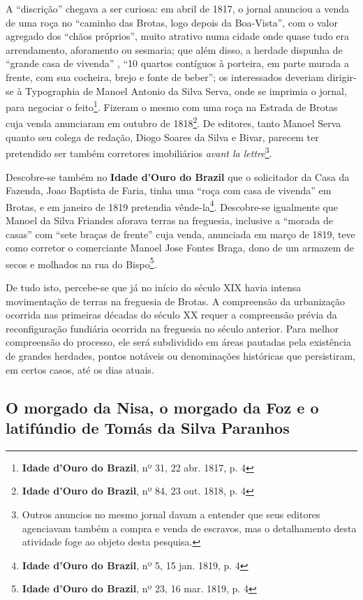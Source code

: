 A ``discrição'' chegava a ser curiosa: em abril de 1817, o jornal anunciou a venda de uma roça no ``caminho das Brotas, logo depois da Boa-Vista'', com o valor agregado dos ``chãos próprios'', muito atrativo numa cidade onde quase tudo era arrendamento, aforamento ou sesmaria; que além disso, a herdade dispunha de ``grande casa de vivenda'' , ``10 quartos contíguos à porteira, em parte murada a frente, com sua cocheira, brejo e fonte de beber''; os interessados deveriam dirigir-se à Typographia de Manoel Antonio da Silva Serva, onde se imprimia o jornal, para negociar o feito\footnote{\textbf{Idade d'Ouro do Brazil}, nº 31, 22 abr. 1817, p. 4}. Fizeram o mesmo com uma roça na Estrada de Brotas cuja venda anunciaram em outubro de 1818\footnote{\textbf{Idade d'Ouro do Brazil}, nº 84, 23 out. 1818, p. 4}. De editores, tanto Manoel Serva quanto seu colega de redação, Diogo Soares da Silva e Bivar, parecem ter pretendido ser também corretores imobiliários \textit{avant la lettre}\footnote{Outros anuncios no mesmo jornal davam a entender que seus editores agenciavam também a compra e venda de escravos, mas o detalhamento desta atividade foge ao objeto desta pesquisa.}.

Descobre-se também no \textbf{Idade d'Ouro do Brazil} que o solicitador da Casa da Fazenda, Joao Baptista de Faria, tinha uma ``roça com casa de vivenda'' em Brotas, e em janeiro de 1819 pretendia vênde-la\footnote{\textbf{Idade d'Ouro do Brazil}, nº 5, 15 jan. 1819, p. 4}. Descobre-se igualmente que Manoel da Silva Friandes aforava terras na freguesia, inclusive a ``morada de casas'' com ``sete braças de frente'' cuja venda, anunciada em março de 1819, teve como corretor o comerciante Manoel Jose Fontes Braga, dono de um armazem de secos e molhados na rua do Bispo\footnote{\textbf{Idade d'Ouro do Brazil}, nº 23, 16 mar. 1819, p. 4}.

De tudo isto, percebe-se que já no início do século XIX havia intensa movimentação de terras na freguesia de Brotas. A compreensão da urbanização ocorrida nas primeiras décadas do século XX requer a compreensão prévia da reconfiguração fundiária ocorrida na freguesia no século anterior. Para melhor compreensão do processo, ele será subdividido em áreas pautadas pela existência de grandes herdades, pontos notáveis ou denominações históricas que persistiram, em certos casos, até os dias atuais.

\subsection{O morgado da Nisa, o morgado da Foz e o latifúndio de Tomás da Silva Paranhos}

